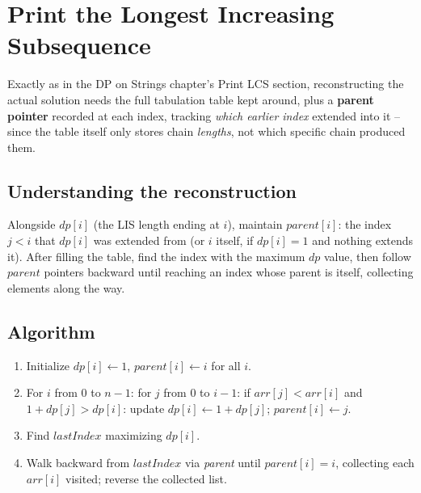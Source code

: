 \section{Print the Longest Increasing Subsequence}
\label{sec:dp-print-lis}


\begin{patternbox}
Exactly as in the DP on Strings chapter's Print LCS section, reconstructing the actual
solution needs the full tabulation table kept around, plus a
\textbf{parent pointer} recorded at each index, tracking \emph{which
earlier index} extended into it -- since the table itself only stores
chain \emph{lengths}, not which specific chain produced them.
\end{patternbox}

\subsection*{Understanding the reconstruction}

Alongside $\textit{dp}[i]$ (the LIS length ending at $i$), maintain
$\textit{parent}[i]$: the index $j<i$ that $\textit{dp}[i]$ was
extended from (or $i$ itself, if $\textit{dp}[i]=1$ and nothing extends
it). After filling the table, find the index with the maximum
$\textit{dp}$ value, then follow $\textit{parent}$ pointers backward
until reaching an index whose parent is itself, collecting elements
along the way.

\subsection*{Algorithm}

\begin{enumerate}
  \item Initialize $\textit{dp}[i] \gets 1$, $\textit{parent}[i] \gets
        i$ for all $i$.
  \item For $i$ from $0$ to $n-1$: for $j$ from $0$ to $i-1$: if
        $\textit{arr}[j]<\textit{arr}[i]$ and $1+\textit{dp}[j] >
        \textit{dp}[i]$: update $\textit{dp}[i] \gets 1+\textit{dp}[j]$;
        $\textit{parent}[i] \gets j$.
  \item Find $\textit{lastIndex}$ maximizing $\textit{dp}[i]$.
  \item Walk backward from $\textit{lastIndex}$ via \textit{parent}
        until $\textit{parent}[i]=i$, collecting each $\textit{arr}[i]$
        visited; reverse the collected list.
\end{enumerate}

